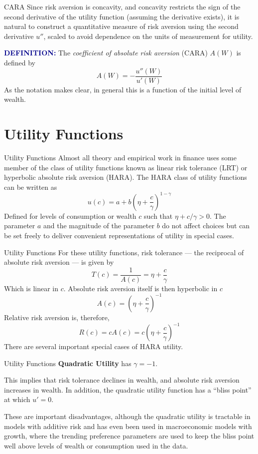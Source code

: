 \documentclass[aspectratio=169,xcolor=dvipsnames]{beamer}
\begin{document}
\begin{frame}{CARA}
    Since risk aversion is concavity, and concavity restricts the sign of the second derivative of the utility function (assuming the derivative exists), it is natural to construct a quantitative measure of risk aversion using the second derivative $u''$, scaled to avoid dependence on the units of measurement for utility.

    \textcolor{darkblue}{\textbf{DEFINITION:}} The \emph{coefficient of absolute risk aversion} (CARA) $A(W)$ is defined by
    \[
        A(W) = - \frac{u''(W)}{u'(W)}
    \]
    As the notation makes clear, in general this is a function of the initial level of wealth.
\end{frame}

\section{Utility Functions}

\begin{frame}{Utility Functions}
    Almost all theory and empirical work in finance uses some member of the class of utility functions known as linear risk tolerance (LRT) or hyperbolic absolute risk aversion (HARA). The HARA class of utility functions can be written as
    \[
        u(c) = a + b\left(\eta + \frac{c}{\gamma}\right)^{1-\gamma}
    \]
    Defined for levels of consumption or wealth $c$ such that $\eta + c/\gamma > 0$. The parameter $a$ and the magnitude of the parameter $b$ do not affect choices but can be set freely to deliver convenient representations of utility in special cases.
\end{frame}

\begin{frame}{Utility Functions}
    For these utility functions, risk tolerance --- the reciprocal of absolute risk aversion --- is given by
    \[
        T(c) = \frac{1}{A(c)} = \eta + \frac{c}{\gamma}
    \]
    Which is linear in $c$. Absolute risk aversion itself is then hyperbolic in $c$
    \[
        A(c) = \left(\eta + \frac{c}{\gamma}\right)^{-1}
    \]
    Relative risk aversion is, therefore,
    \[
        R(c) = c A(c) = c \left(\eta + \frac{c}{\gamma}\right)^{-1}
    \]
    There are several important special cases of HARA utility.
\end{frame}

\begin{frame}{Utility Functions}
    \textbf{Quadratic Utility} has $\gamma = -1$.

    This implies that risk tolerance declines in wealth, and absolute risk aversion increases in wealth. In addition, the quadratic utility function has a ``bliss point'' at which $u' = 0$.

    These are important disadvantages, although the quadratic utility is tractable in models with additive risk and has even been used in macroeconomic models with growth, where the trending preference parameters are used to keep the bliss point well above levels of wealth or consumption used in the data.
\end{frame}
\end{document}

